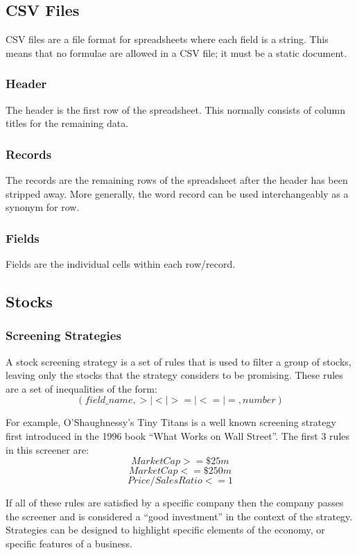 \subsection{CSV Files}
CSV files are a file format for spreadsheets where each field is a string. This means that no formulae are allowed in a CSV file; it must be a static document.

\subsubsection{Header}
The header is the first row of the spreadsheet. This normally consists of column titles for the remaining data.

\subsubsection{Records}
The records are the remaining rows of the spreadsheet after the header has been stripped away. More generally, the word record can be used interchangeably as a synonym for row.

\subsubsection{Fields}
Fields are the individual cells within each row/record.

\subsection{Stocks}
\subsubsection{Screening Strategies}
A stock screening strategy is a set of rules that is used to filter a group of stocks, leaving only the stocks that the strategy considers to be promising. These rules are a set of inequalities of the form: \vspace{-2mm}
\begin{equation}
    (field\_name, > | < | >= | <= | = , number)
\end{equation}

For example, O’Shaughnessy’s Tiny Titans is a well known screening strategy first introduced in the 1996 book ``What Works on Wall Street''. \cite{tinyTitans} The first 3 rules in this screener are:
\vspace{-3mm}
\begin{equation}
    Market Cap >= \$25m
\end{equation}
\vspace{-7mm}
\begin{equation}
    Market Cap <= \$250m
\end{equation}
\vspace{-5mm}
\begin{equation}
    Price/Sales Ratio <= 1
\end{equation}

If all of these rules are satisfied by a specific company then the company passes the screener and is considered a ``good investment'' in the context of the strategy. Strategies can be designed to highlight specific elements of the economy, or specific features of a business.